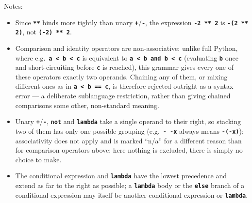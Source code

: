Notes:
\begin{itemize}
\item Since \texttt{\textbf{**}} binds more tightly than unary
  \texttt{\textbf{+}}/\texttt{\textbf{-}}, the expression
  \texttt{\textbf{-2 ** 2}} is \texttt{\textbf{-(2 ** 2)}}, not
  \texttt{\textbf{(-2) ** 2}}.
\item Comparison and identity operators are non-associative:
  unlike full Python, where e.g.\ \texttt{\textbf{a < b < c}} is
  equivalent to \texttt{\textbf{a < b and b < c}} (evaluating
  \texttt{\textbf{b}} once and short-circuiting before
  \texttt{\textbf{c}} is reached), this grammar gives every one of these
  operators exactly two operands. Chaining any of them, or mixing
  different ones as in \texttt{\textbf{a < b == c}}, is therefore
  rejected outright as a syntax error --- a deliberate sublanguage
  restriction, rather than giving chained comparisons some other,
  non-standard meaning.
\item Unary \texttt{\textbf{+}}/\texttt{\textbf{-}}, \textbf{\texttt{not}}
  and \textbf{\texttt{lambda}} take a single operand to their right, so
  stacking two of them has only one possible grouping (e.g.\
  \texttt{\textbf{- -x}} always means \texttt{\textbf{-(-x)}});
  associativity does not apply and is marked ``n/a'' for a different
  reason than for comparison operators above: here nothing is excluded,
  there is simply no choice to make.
\item The conditional expression and \textbf{\texttt{lambda}} have the
  lowest precedence and extend as far to the right as possible; a
  \textbf{\texttt{lambda}} body or the \textbf{\texttt{else}} branch of a
  conditional expression may itself be another conditional expression or
  \textbf{\texttt{lambda}}.
\end{itemize}
